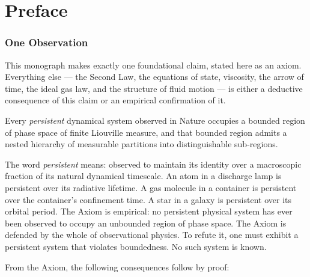
\part*{Preface}

\section*{One Observation}

This monograph makes exactly one foundational claim, stated here as an axiom. Everything else — the Second Law, the equations of state, viscosity, the arrow of time, the ideal gas law, and the structure of fluid motion — is either a deductive consequence of this claim or an empirical confirmation of it.

\begin{axiom}
\label{ax:bpsl}
Every \emph{persistent} dynamical system observed in Nature occupies a bounded region of phase space of finite Liouville measure, and that bounded region admits a nested hierarchy of measurable partitions into distinguishable sub-regions.
\end{axiom}

The word \emph{persistent} means: observed to maintain its identity over a macroscopic fraction of its natural dynamical timescale. An atom in a discharge lamp is persistent over its radiative lifetime. A gas molecule in a container is persistent over the container's confinement time. A star in a galaxy is persistent over its orbital period. The Axiom is empirical: no persistent physical system has ever been observed to occupy an unbounded region of phase space. The Axiom is defended by the whole of observational physics. To refute it, one must exhibit a persistent system that violates boundedness. No such system is known.

\medskip

From the Axiom, the following consequences follow by proof:

